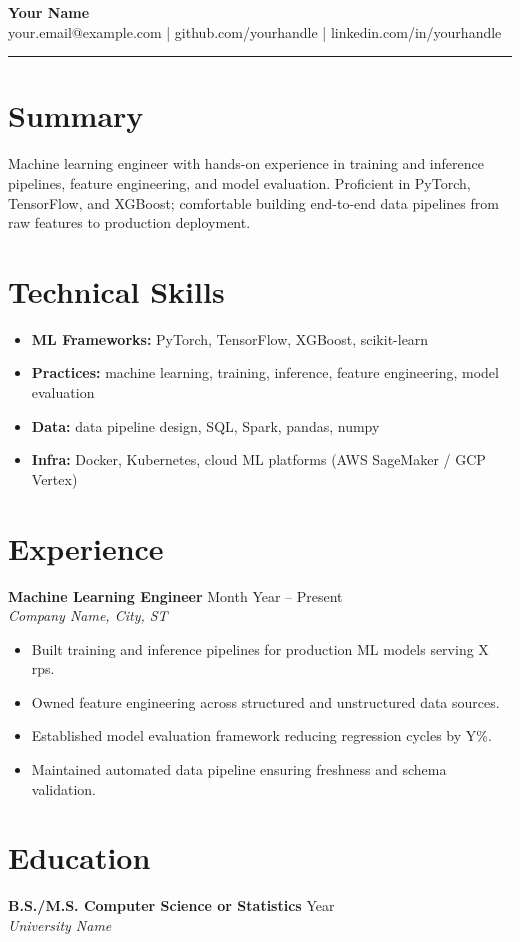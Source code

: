 \documentclass[11pt,letterpaper]{article}
\begin{document}
{\Large \textbf{Your Name}} \\
your.email@example.com \quad | \quad github.com/yourhandle \quad | \quad linkedin.com/in/yourhandle

\bigskip
\hrule
\bigskip

\section*{Summary}
Machine learning engineer with hands-on experience in training and inference pipelines,
feature engineering, and model evaluation. Proficient in PyTorch, TensorFlow, and XGBoost;
comfortable building end-to-end data pipelines from raw features to production deployment.

\section*{Technical Skills}
\begin{itemize}[leftmargin=*]
  \item \textbf{ML Frameworks:} PyTorch, TensorFlow, XGBoost, scikit-learn
  \item \textbf{Practices:} machine learning, training, inference, feature engineering, model evaluation
  \item \textbf{Data:} data pipeline design, SQL, Spark, pandas, numpy
  \item \textbf{Infra:} Docker, Kubernetes, cloud ML platforms (AWS SageMaker / GCP Vertex)
\end{itemize}

\section*{Experience}

\textbf{Machine Learning Engineer} \hfill Month Year -- Present \\
\textit{Company Name, City, ST}
\begin{itemize}[leftmargin=*]
  \item Built training and inference pipelines for production ML models serving X rps.
  \item Owned feature engineering across structured and unstructured data sources.
  \item Established model evaluation framework reducing regression cycles by Y\%.
  \item Maintained automated data pipeline ensuring freshness and schema validation.
\end{itemize}

\section*{Education}
\textbf{B.S./M.S. Computer Science or Statistics} \hfill Year \\
\textit{University Name}
\end{document}
